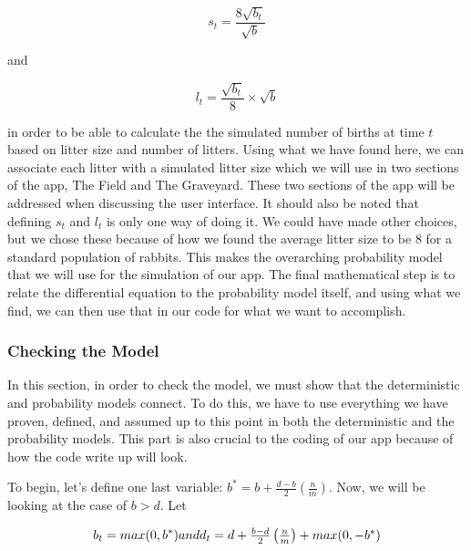 \documentclass{article}\usepackage[]{graphicx}\usepackage[]{color}
\begin{document}
\begin{equation}
s_t = \frac{8\sqrt{b_t}}{\sqrt{b}}
\end{equation}

and 

\begin{equation}
l_t = \frac{\sqrt{b_t}}{8}\times \sqrt{b}
\end{equation}

\noindent in order to be able to calculate the the simulated number of births at time \(t\) based on litter size and number of litters. Using what we have found here, we can associate each litter with a simulated litter size which we will use in two sections of the app, The Field and The Graveyard. These two sections of the app will be addressed when discussing the user interface. It should also be noted that defining \(s_t\) and \(l_t\) is only one way of doing it. We could have made other choices, but we chose these because of how we found the average litter size to be 8 for a standard population of rabbits. This makes the overarching probability model that we will use for the simulation of our app. The final mathematical step is to relate the differential equation to the probability model itself, and using what we find, we can then use that in our code for what we want to accomplish. 









\subsubsection{Checking the Model}

In this section, in order to check the model, we must show that the deterministic and probability models connect. To do this, we have to use everything we have proven, defined, and assumed up to this point in both the deterministic and the probability models. This part is also crucial to the coding of our app because of how the code write up will look. 

To begin, let's define one last variable: \(b^* = b + \frac{d-b}{2} \left( \frac{n}{m}\right)\). Now, we will be looking at the case of \(b > d\). Let 

\begin{equation}
b_t = max(0, b^*)$$ and $$d_t = d + \frac{b-d}{2} \left(\frac{n}{m}\right) + max(0, -b^*)
\end{equation}
\end{document}
